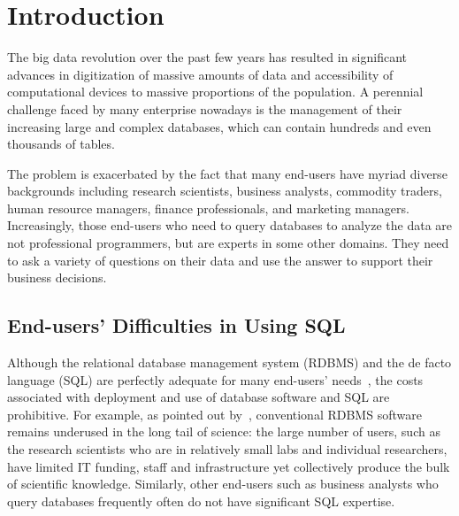 \section{Introduction}
\label{sec:introduction}


The big data revolution over the past few years has resulted
in significant advances in digitization of massive amounts
of data and accessibility of computational devices to massive
proportions of the population. A perennial challenge faced by many
enterprise nowadays is the management
of their increasing large and complex databases, which can contain
hundreds and even thousands of tables. 

The problem is exacerbated by the fact that many end-users
have myriad diverse backgrounds including research scientists,
business analysts, commodity traders, human resource managers,
finance professionals, and marketing managers. Increasingly,
those end-users who need to query databases to analyze the
data are not professional programmers, but are experts in some
other domains. They need to ask a variety of questions on their
data and use the answer to support their business decisions.



\subsection{End-users' Difficulties in Using SQL}

Although the relational database management system (RDBMS) and the
de facto language (SQL) are perfectly adequate for many end-users'
needs~\cite{Howe:2011}, the costs associated with deployment and
use of database software and SQL are prohibitive. For example, as pointed out
by~\cite{Gray:2005}, conventional RDBMS software remains underused
in the long tail of science: the large number of users, such as the
research scientists who are in relatively small labs and individual
researchers, have limited IT funding, staff and infrastructure yet
collectively produce the bulk of scientific knowledge. Similarly, other end-users
such as business analysts who query databases frequently often
do not have significant SQL expertise.

